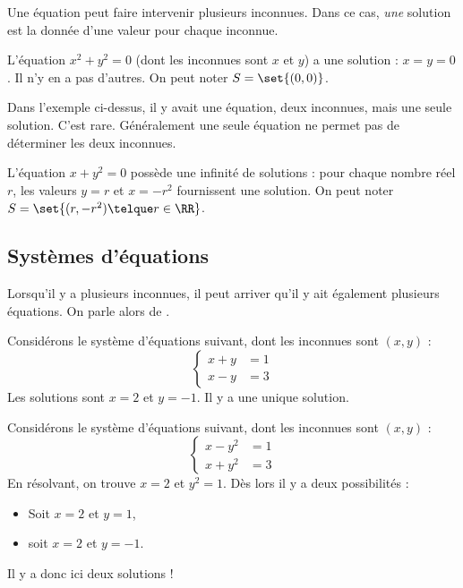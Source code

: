 \documentclass[french,xcolor=svgnames]{beamer}
\begin{document}
\begin{frame}
  Une équation peut faire intervenir plusieurs inconnues. Dans ce cas, \emph{une} solution est la donnée d'une valeur pour chaque inconnue.\pause
  \begin{example}
    L'équation \(x^{2}+y^{2} = 0\) (dont les inconnues sont \(x\) et \(y\)) a une solution : \(x = y = 0\). Il n'y en a pas d'autres. On peut noter \(S = \set{(0,0)}\).
  \end{example}\pause
  Dans l'exemple ci-dessus, il y avait une équation, deux inconnues, mais une seule solution. C'est rare. Généralement une seule équation ne permet pas de déterminer les deux inconnues.\pause
  \begin{example}
    L'équation \(x+ y^{2} = 0\) possède une infinité de solutions : pour chaque nombre réel \(r\), les valeurs \(y = r\) et \(x = -r^{2}\) fournissent une solution. On peut noter \(S = \set{(r,-r^{2}) \telque r \in \RR}\).
  \end{example}
\end{frame}

\subsection{Systèmes d'équations}
\begin{frame}
Lorsqu'il y a plusieurs inconnues, il peut arriver qu'il y ait également plusieurs équations. On parle alors de .\pause
\begin{example}
  Considérons le système d'équations suivant, dont les inconnues sont \((x,y)\) :
  \begin{equation*}
    \begin{cases}
      x + y &= 1\\
      x - y &= 3
    \end{cases}
  \end{equation*}
  Les solutions sont \(x = 2\) et \(y = -1\). Il y a une unique solution.
\end{example}
\end{frame}

\begin{frame}
\begin{example}
  Considérons le système d'équations suivant, dont les inconnues sont \((x,y)\) :
  \begin{equation*}
    \begin{cases}
      x - y^{2} &= 1\\
      x + y^{2} &= 3
    \end{cases}
  \end{equation*}
  En résolvant, on trouve \(x = 2\) et \(y^{2} = 1\). Dès lors il y a deux possibilités :
  \begin{itemize}
  \item Soit \(x = 2\) et \(y = 1\),
  \item soit \(x = 2\) et \(y = -1\).
  \end{itemize}
  Il y a donc ici deux solutions !
\end{example}
\end{frame}
\end{document}
